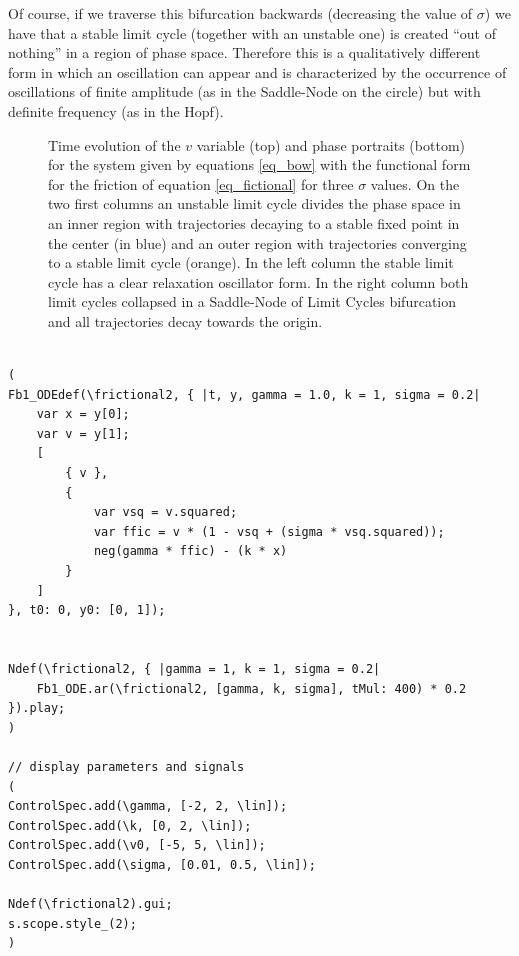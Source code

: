 \documentclass{article}
\begin{document}
Of course, if we traverse this bifurcation backwards (decreasing the value of $\sigma$) we have that a stable limit cycle (together with an unstable one) is created “out of nothing” in a region of phase space. 
Therefore this is a qualitatively different form in which an oscillation can appear and is characterized by the occurrence of oscillations of finite amplitude (as in the Saddle-Node on the circle) but with definite frequency (as in the Hopf).




\begin{figure}[h]
    \centering
    \caption{Time evolution of the $v$ variable (top) and phase portraits (bottom) for the system given by equations \ref{eq_bow} with the functional form for the friction of equation \ref{eq_fictional} for three $\sigma$ values. On the two first columns an unstable limit cycle divides the phase space in an inner region with trajectories decaying to a stable fixed point in the center (in blue) and an outer region with trajectories converging to a stable limit cycle (orange). In the left column the stable limit cycle has a clear relaxation oscillator form. In the right column both limit cycles collapsed in a Saddle-Node of Limit Cycles bifurcation and all trajectories decay towards the origin.} 
    \label{fig_friction2}
    
\end{figure}

\begin{lstlisting}[frame=single,caption=A dynamical system with stick slip friction.]

(
Fb1_ODEdef(\frictional2, { |t, y, gamma = 1.0, k = 1, sigma = 0.2|
	var x = y[0];
	var v = y[1];
	[
		{ v },
		{
			var vsq = v.squared;
			var ffic = v * (1 - vsq + (sigma * vsq.squared));
			neg(gamma * ffic) - (k * x)
		}
	]
}, t0: 0, y0: [0, 1]);


Ndef(\frictional2, { |gamma = 1, k = 1, sigma = 0.2|
	Fb1_ODE.ar(\frictional2, [gamma, k, sigma], tMul: 400) * 0.2
}).play;
)

// display parameters and signals
(
ControlSpec.add(\gamma, [-2, 2, \lin]);
ControlSpec.add(\k, [0, 2, \lin]);
ControlSpec.add(\v0, [-5, 5, \lin]);
ControlSpec.add(\sigma, [0.01, 0.5, \lin]);

Ndef(\frictional2).gui;
s.scope.style_(2);
)
\end{lstlisting}
\end{document}
